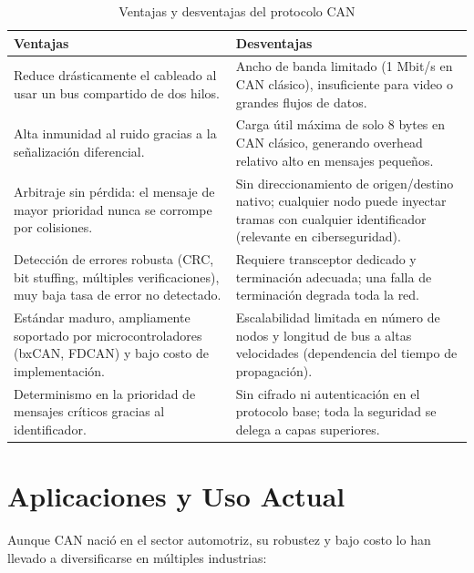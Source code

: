 \documentclass[pdflatex,sn-mathphys-num]{sn-jnl}%
\begin{document}
\begin{table}[!h]
\centering
\caption{Ventajas y desventajas del protocolo CAN}
\label{tab:proscons}
\begin{tabular}{|p{6.8cm}|p{6.8cm}|}
\hline
\textbf{Ventajas} & \textbf{Desventajas} \\ \hline
Reduce drásticamente el cableado al usar un bus compartido de dos hilos. & Ancho de banda limitado (1 Mbit/s en CAN clásico), insuficiente para video o grandes flujos de datos. \\ \hline
Alta inmunidad al ruido gracias a la señalización diferencial. & Carga útil máxima de solo 8 bytes en CAN clásico, generando overhead relativo alto en mensajes pequeños. \\ \hline
Arbitraje sin pérdida: el mensaje de mayor prioridad nunca se corrompe por colisiones. & Sin direccionamiento de origen/destino nativo; cualquier nodo puede inyectar tramas con cualquier identificador (relevante en ciberseguridad). \\ \hline
Detección de errores robusta (CRC, bit stuffing, múltiples verificaciones), muy baja tasa de error no detectado. & Requiere transceptor dedicado y terminación adecuada; una falla de terminación degrada toda la red. \\ \hline
Estándar maduro, ampliamente soportado por microcontroladores (bxCAN, FDCAN) y bajo costo de implementación. & Escalabilidad limitada en número de nodos y longitud de bus a altas velocidades (dependencia del tiempo de propagación). \\ \hline
Determinismo en la prioridad de mensajes críticos gracias al identificador. & Sin cifrado ni autenticación en el protocolo base; toda la seguridad se delega a capas superiores. \\ \hline
\end{tabular}
\end{table}

\section{Aplicaciones y Uso Actual}\label{sec:applications}
Aunque CAN nació en el sector automotriz, su robustez y bajo costo lo han llevado a diversificarse en múltiples industrias:
\end{document}
